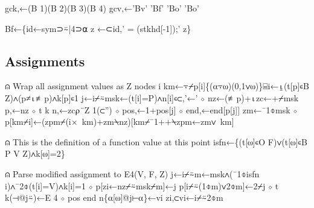 \documentclass{article}%
\begin{document}
\nwenddocs{}\plusendmoddef\nwstartdeflinemarkup{}\nwenddeflinemarkup
gck,←(B 1)(B 2)(B 3)(B 4)
gcv,←'Bv' 'Bf' 'Bo' 'Bo'
\nwendcode{}\nwdocspar

\nwenddocs{}\plusendmoddef\nwstartdeflinemarkup{}\nwenddeflinemarkup
Bf←\{id←sym⊃⍨|4⊃⍺
        z ←⊂id,' = (stkhd[-1]);'
z\}
\nwendcode{}\nwdocspar

\subsection{Assignments}

\nwenddocs{}\endmoddef\nwstartdeflinemarkup{}\nwenddeflinemarkup
⍝ Wrap all assignment values as Z nodes
i km←⍪⌿p[i]\{(⍺⍪⍵)(0,1∨⍵)\}⌸i←⍸(t[p]∊B Z)∧(p≠⍳≢p)∧k[p]∊1
j←i⌿⍨msk←(t[i]=P)∧n[i]∊⊂,'←' ⋄ nz←(≢p)+⍳zc←+⌿msk
p,←nz ⋄ t k n,←zc⍴¨Z 1(⊂'') ⋄ pos,←1+pos[j] ⋄ end,←end[p[j]]
zm←¯1⌽msk ⋄ p[km⌿i]←(zpm⌿(i×~km)+zm⍀nz)[km⌿¯1++⍀zpm←zm∨~km]

⍝ This is the definition of a function value at this point
isfn←\{(t[⍵]∊O F)∨(t[⍵]∊B P V Z)∧k[⍵]=2\}

⍝ Parse modified assignment to E4(V, F, Z)
j←i⌿⍨m←msk∧(¯1⌽isfn i)∧¯2⌽(t[i]=V)∧k[i]=1 ⋄ p[zi←nz⌿⍨msk⌿m]←j
p[i⌿⍨(1⌽m)∨2⌽m]←2⌿j ⋄ t k(⊣@j⍨)←E 4 ⋄ pos end n\{⍺[⍵]@j⊢⍺\}←vi zi,⊂vi←i⌿⍨2⌽m
\end{document}
